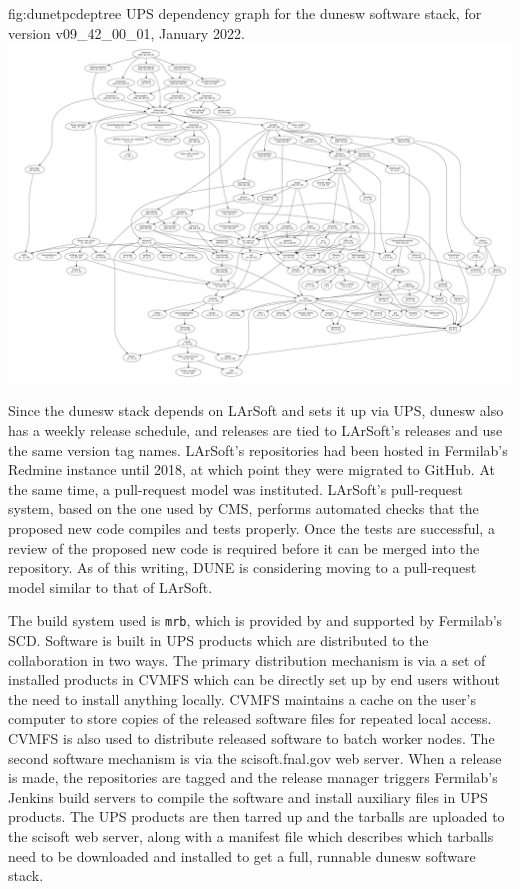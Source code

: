 \documentclass[../main-v1.tex]{subfiles}
\begin{document}
\begin{dunefigure}
{fig:dunetpcdeptree}
{UPS dependency graph for the dunesw software stack, for version v09\_42\_00\_01, January 2022.}
\includegraphics[width=\textwidth]{graphics/CodeManagementFigures/dunesw_v09_42_00_01_graph.pdf}
\end{dunefigure}

Since the dunesw stack depends on LArSoft and sets it up via UPS, dunesw also has a weekly release schedule, and releases are tied to LArSoft's releases and use the same version tag names.  LArSoft's repositories had been hosted in Fermilab's Redmine instance until 2018, at which point they were migrated to GitHub.  At the same time, a pull-request model was instituted.  LArSoft's pull-request system, based on the one used by CMS, performs automated checks that the proposed new code compiles and tests properly.  Once the tests are successful, a review of the proposed new code is required before it can be merged into the repository.  As of this writing, DUNE is considering moving to a pull-request model similar to that of LArSoft.

The build system used is {\tt mrb}, which is provided by and supported by Fermilab's SCD.  Software is built in UPS products which are distributed to the collaboration in two ways.  The primary distribution mechanism is via a set of installed products in CVMFS which can be directly set up by end users without the need to install anything locally.  CVMFS maintains a cache on the user's computer to store copies of the released software files for repeated local access.  CVMFS is also used to distribute released software to batch worker nodes.  The second software mechanism is via the scisoft.fnal.gov web server.  When a release is made, the repositories are tagged and the release manager triggers Fermilab's Jenkins build servers to compile the software and install auxiliary files in UPS products.  The UPS products are then tarred up and the tarballs are uploaded to the scisoft web server, along with a manifest file which describes which tarballs need to be downloaded and installed to get a full, runnable dunesw software stack.
\end{document}
